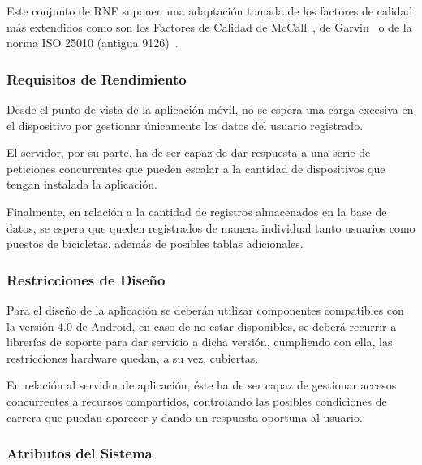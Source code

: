 Este conjunto de RNF suponen una adaptación tomada de los factores de calidad más extendidos como son los Factores de Calidad de McCall~\cite{McC77}, de Garvin~\cite{Gar87} o de la norma ISO 25010 (antigua 9126)~\cite{ISO25}.

\subsubsection{Requisitos de Rendimiento}

Desde el punto de vista de la aplicación móvil, no se espera una carga excesiva en el dispositivo por gestionar únicamente los datos del usuario registrado.

El servidor, por su parte, ha de ser capaz de dar respuesta a una serie de peticiones concurrentes que pueden escalar a la cantidad de dispositivos que tengan instalada la aplicación.

Finalmente, en relación a la cantidad de registros almacenados en la base de datos, se espera que queden registrados de manera individual tanto usuarios como puestos de bicicletas, además de posibles tablas adicionales.

\subsubsection{Restricciones de Diseño}

Para el diseño de la aplicación se deberán utilizar componentes compatibles con la versión 4.0 de Android, en caso de no estar disponibles, se deberá recurrir a librerías de soporte para dar servicio a dicha versión, cumpliendo con ella, las restricciones hardware quedan, a su vez, cubiertas.

En relación al servidor de aplicación, éste ha de ser capaz de gestionar accesos concurrentes a recursos compartidos, controlando las posibles condiciones de carrera que puedan aparecer y dando un respuesta oportuna al usuario. 

\subsubsection{Atributos del Sistema}

